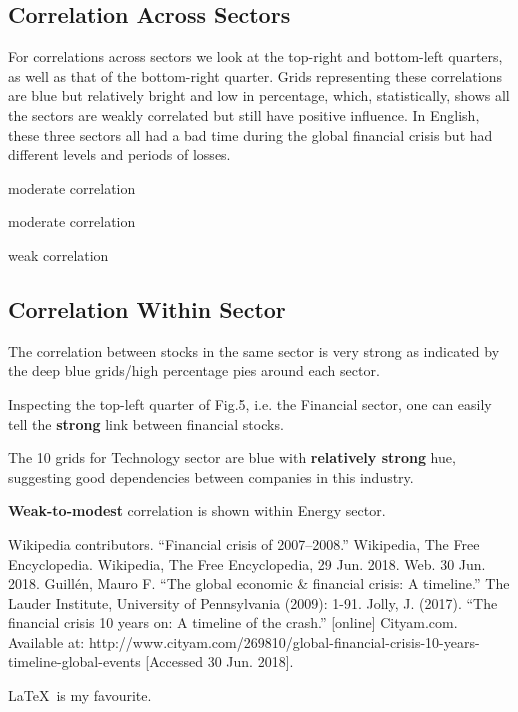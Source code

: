 \documentclass[11pt]{article}
\begin{document}
\subsection{Correlation Across Sectors}\vspace{-1em}
For correlations across sectors we look at the top-right and bottom-left quarters, as well as that of the bottom-right quarter. Grids representing these correlations are blue but relatively bright and low in percentage, which, statistically, shows all the sectors are weakly correlated but still have positive influence. In English, these three sectors all had a bad time during the global financial crisis but had different levels and periods of losses.
\begin{description}\vspace{-1em}
\item[Financial vs Technology] moderate correlation
\item[Technology vs Energy] moderate correlation
\item[Energy vs Financial] weak correlation
\end{description}

\subsection{Correlation Within Sector}\vspace{-1em}
The correlation between stocks in the same sector is very strong as indicated by the deep blue grids/high percentage pies around each sector. 
\begin{description}\vspace{-1em}
\item[Financial Sector] Inspecting the top-left quarter of Fig.5, i.e. the Financial sector, one can easily tell the \textbf{strong} link between financial stocks.
\item[Technology Sector] The 10 grids for Technology sector are blue with \textbf{relatively strong} hue, suggesting good dependencies between companies in this industry.
\item[Energy Sector] \textbf{Weak-to-modest} correlation is shown within Energy sector.
\end{description}
  

\newpage
\vspace{-0.8em}
\begin{thebibliography}{9}
 Wikipedia contributors. ``Financial crisis of 2007–2008.'' Wikipedia, The Free Encyclopedia. Wikipedia, The Free Encyclopedia, 29 Jun. 2018. Web. 30 Jun. 2018.
 Guillén, Mauro F. ``The global economic \& financial crisis: A timeline.'' The Lauder Institute, University of Pennsylvania (2009): 1-91.
 Jolly, J. (2017). ``The financial crisis 10 years on: A timeline of the crash.'' [online] Cityam.com. Available at: http://www.cityam.com/269810/global-financial-crisis-10-years-timeline-global-events [Accessed 30 Jun. 2018].
\end{thebibliography}
\LaTeX\ is my favourite.
\end{document}
